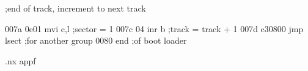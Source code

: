                                   ;end of track, increment to next track

007a 0e01                                   mvi  c,l               ;sector = 1
007c 04                                     inr  b                 ;track = track + 1
007d c30800                                 jmp  lsect             ;for another group
0080                                        end                    ;of boot loader


.nx appf

